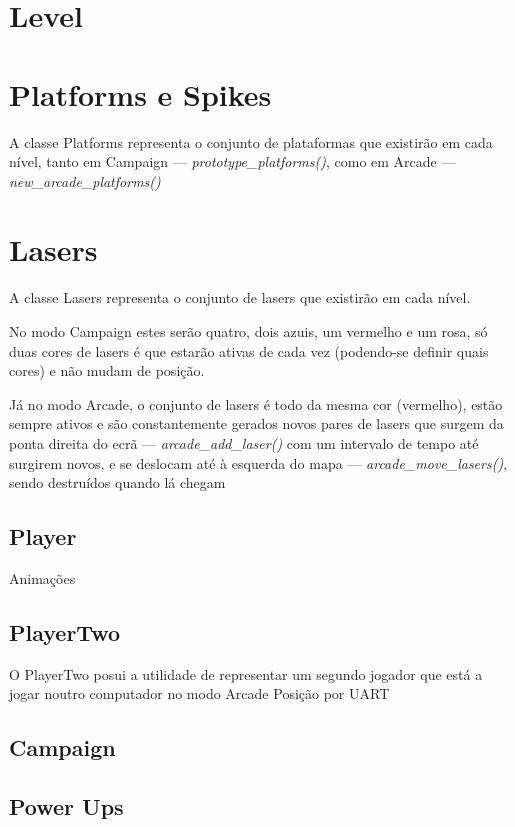 \documentclass{report}
\begin{document}
\section{Level}

\section{Platforms e Spikes}

A classe Platforms representa o conjunto de plataformas que existirão em cada nível, tanto em Campaign --- \textit{prototype\_platforms()}, como em Arcade --- \textit{new\_arcade\_platforms()}

\section{Lasers}

A classe Lasers representa o conjunto de lasers que existirão em cada nível. 

No modo Campaign estes serão quatro, dois azuis, um vermelho e um rosa, só duas cores de lasers é que estarão ativas de cada vez (podendo-se definir quais cores) e não mudam de posição.

Já no modo Arcade, o conjunto de lasers é todo da mesma cor (vermelho), estão sempre ativos e são constantemente gerados novos pares de lasers que surgem da ponta direita do ecrã --- \textit{arcade\_add\_laser()} com um intervalo de tempo até surgirem novos, e se deslocam até à esquerda do mapa --- \textit{arcade\_move\_lasers()}, sendo destruídos quando lá chegam \textit{}

\subsection{Player}

Animações

\subsection{PlayerTwo}

O PlayerTwo posui a utilidade de representar um segundo jogador que está a jogar noutro computador no modo Arcade
Posição por UART 

\subsection{Campaign}

\subsection{Power Ups}
\end{document}
